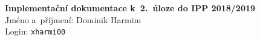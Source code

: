 \documentclass[10pt, a4paper]{article}
\begin{document}
    {\parindent 0pt \Large
        \textbf{Implementační dokumentace k~2.~úloze do IPP 2018/2019} \\
        Jméno a~příjmení: Dominik Harmim \\
        Login: \texttt{xharmi00}
    }
\end{document}

